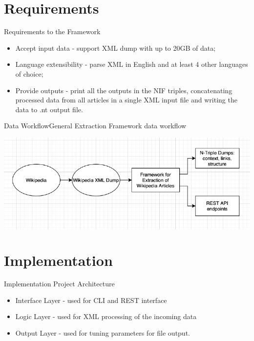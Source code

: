 \documentclass[czech,aspectratio=169]{beamer}
\begin{document}
    \section{Requirements}
    \begin{frame}{Requirements to the Framework}
        \begin{itemize}
            \item Accept input data - support XML dump with up to 20GB of data;
            \item Language extensibility - parse XML in English and at least 4 other languages of choice;
            \item Provide outputs - print all the outputs in the
NIF triples, concatenating processed data from all articles in a single
XML input file and writing the data to .nt output file.
        \end{itemize}
    \end{frame}
    
\begin{frame}{Data Workflow}{General Extraction Framework data workflow}
	\begin{center}
		\includegraphics[width=0.6\paperwidth]{data_workflow.png}
	\end{center}
\end{frame}

    \section{Implementation}
	\begin{frame}{Implementation}{ Project Architecture}
		  \begin{itemize}
			\item Interface Layer - used for CLI and REST interface
			\item Logic Layer - used for XML processing of the incoming data
			\item Output Layer - used for tuning parameters for file output.
		\end{itemize}
	\end{frame}
\end{document}
